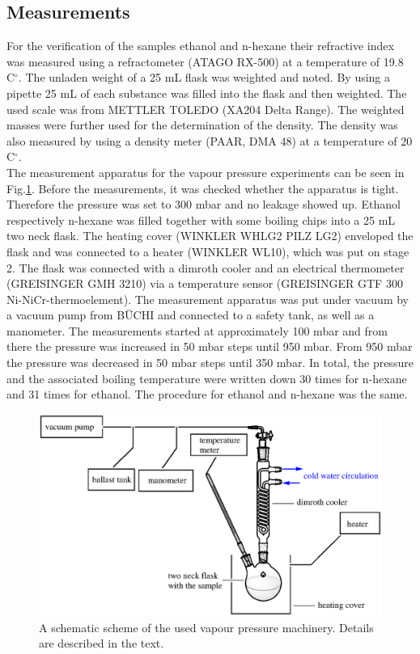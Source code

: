 \documentclass[a4paper,abstracton]{article}	                       %
\begin{document}
\subsection*{Measurements}
For the verification of the samples ethanol and n-hexane their refractive index was measured using a refractometer (ATAGO RX-500) at a temperature of 19.8 C$^{\circ}$. The unladen weight of a 25 mL flask was weighted and noted. By using a pipette 25 mL of each substance was filled into the flask and then weighted. The used scale was from METTLER TOLEDO (XA204 Delta Range). The weighted masses were further used for the determination of the density. The density was also measured by using a density meter (PAAR, DMA 48) at a temperature of 20 C$^{\circ}$. 
\\
The measurement apparatus for the vapour pressure experiments can be seen in Fig.\ref{fig:Skizze1}. Before the measurements, it was checked whether the apparatus is tight. Therefore the pressure was set to 300 mbar and no leakage showed up. Ethanol respectively n-hexane was filled together with some boiling chips into a 25 mL two neck flask. The heating cover (WINKLER WHLG2 PILZ LG2) enveloped the flask and was connected to a heater (WINKLER WL10), which was put on stage 2. The flask was connected with a dimroth cooler and an electrical thermometer (GREISINGER GMH 3210) via a temperature sensor (GREISINGER GTF 300 Ni-NiCr-thermoelement). The measurement apparatus was put under vacuum by a vacuum pump from B\"UCHI and connected to a safety tank, as well as a manometer. The measurements started at approximately 100 mbar and from there the pressure was increased in 50 mbar steps until 950 mbar. From 950 mbar the pressure was decreased in 50 mbar steps until 350 mbar. In total, the pressure and the associated boiling temperature were written down 30 times for n-hexane and 31 times for ethanol. The procedure for ethanol and n-hexane was the same.   

\begin{figure}[H]
\centering
 \includegraphics[scale = 0.8]{skizze1DDR.eps}
\caption{\label{fig:Skizze1}A schematic scheme of the used vapour pressure machinery. Details are described in the text.} 
\end{figure}
\end{document}
